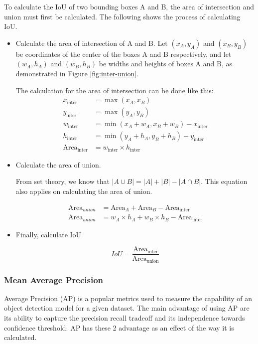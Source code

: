   To calculate the IoU of two bounding boxes A and B, the area of intersection and union must first
  be calculated. The following shows the process of calculating IoU.
  \begin{itemize}[topsep=0pt]
    \item Calculate the area of intersection of A and B. 
    Let $(x_A,y_A)$ and $(x_B,y_B)$ be coordinates of the center of the boxes A and B respectively,
    and let $(w_A,h_A)$ and $(w_B,h_B)$ be widths and heights of boxes A and B, as demonstrated in Figure \ref{fig:inter-union}.

    The calculation for the area of intersection can be done like this:
    \begin{align*}
      x_{\text{{inter}}} &= \max(x_A, x_B) \\
      y_{\text{{inter}}} &= \max(y_A, y_B) \\
      w_{\text{{inter}}} &= \min(x_A + w_A, x_B + w_B) - x_{\text{{inter}}} \\
      h_{\text{{inter}}} &= \min(y_A + h_A, y_B + h_B) - y_{\text{{inter}}} \\
      \text{Area}_{\text{inter}} &= w_{\text{{inter}}} \times h_{\text{{inter}}}
    \end{align*}

    \item Calculate the area of union.

    From set theory, we know that $|A \cup B| =|A| + |B| - |A \cap B| $.
    This equation also applies on calculating the area of union.

    \begin{align*}
      \text{Area}_{union} &= \text{Area}_A + \text{Area}_B - \text{Area}_{\text{inter}}\\
      \text{Area}_{union} &= w_A\times h_A + w_B\times h_B  - \text{Area}_{\text{inter}}
    \end{align*}

    \item Finally, calculate IoU

    \begin{equation}
      IoU = \frac{\text{Area}_{\text{inter}}}{\text{Area}_{\text{union}}}
    \end{equation}
  \end{itemize} 

  

  \subsubsection{Mean Average Precision}
  Average Precision (AP) is a popular metrics used to measure the capability of an object detection model
  for a given dataset. The main advantage of using AP are its ability to capture the precision recall
  tradeoff and its independence towards confidence threshold. AP has these 2 advantage as an effect of the way 
  it is calculated.

